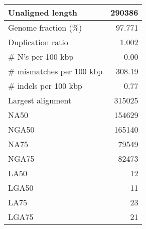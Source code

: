 \documentclass[12pt,a4paper]{article}
\begin{document}
\begin{table}[ht]
\begin{center}
\begin{tabular}{|l*{1}{|r}|}
Unaligned length & 290386 \\ \hline
Genome fraction (\%) & 97.771 \\ \hline
Duplication ratio & 1.002 \\ \hline
\# N's per 100 kbp & 0.00 \\ \hline
\# mismatches per 100 kbp & 308.19 \\ \hline
\# indels per 100 kbp & 0.77 \\ \hline
Largest alignment & 315025 \\ \hline
NA50 & 154629 \\ \hline
NGA50 & 165140 \\ \hline
NA75 & 79549 \\ \hline
NGA75 & 82473 \\ \hline
LA50 & 12 \\ \hline
LGA50 & 11 \\ \hline
LA75 & 23 \\ \hline
LGA75 & 21 \\ \hline
\end{tabular}
\end{center}
\end{table}
\end{document}

